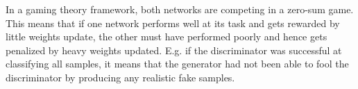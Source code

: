 \documentclass[11pt,a4paper,twoside]{report}
\begin{document}
In a gaming theory framework, both networks are competing in a zero-sum game. This means that if one network performs well at its task and gets rewarded by little weights update, the other must have performed poorly and hence gets penalized by heavy weights updated. E.g. if the discriminator was successful at classifying all samples, it means that the generator had not been able to fool the discriminator by producing any realistic fake samples.  







\end{document}
